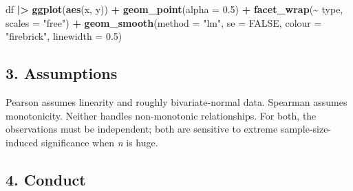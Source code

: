 \documentclass[
]{article}
\newenvironment{Shaded}{\begin{snugshade}}{\end{snugshade}}
\newcommand{\AttributeTok}[1]{\textcolor[rgb]{0.13,0.29,0.53}{#1}}
\newcommand{\ConstantTok}[1]{\textcolor[rgb]{0.56,0.35,0.01}{#1}}
\newcommand{\FloatTok}[1]{\textcolor[rgb]{0.00,0.00,0.81}{#1}}
\newcommand{\FunctionTok}[1]{\textcolor[rgb]{0.13,0.29,0.53}{\textbf{#1}}}
\newcommand{\NormalTok}[1]{#1}
\newcommand{\SpecialCharTok}[1]{\textcolor[rgb]{0.81,0.36,0.00}{\textbf{#1}}}
\newcommand{\StringTok}[1]{\textcolor[rgb]{0.31,0.60,0.02}{#1}}
\begin{document}
\begin{Shaded}
\begin{Highlighting}[]
\NormalTok{df }\SpecialCharTok{|\textgreater{}}
  \FunctionTok{ggplot}\NormalTok{(}\FunctionTok{aes}\NormalTok{(x, y)) }\SpecialCharTok{+}
  \FunctionTok{geom\_point}\NormalTok{(}\AttributeTok{alpha =} \FloatTok{0.5}\NormalTok{) }\SpecialCharTok{+}
  \FunctionTok{facet\_wrap}\NormalTok{(}\SpecialCharTok{\textasciitilde{}}\NormalTok{ type, }\AttributeTok{scales =} \StringTok{"free"}\NormalTok{) }\SpecialCharTok{+}
  \FunctionTok{geom\_smooth}\NormalTok{(}\AttributeTok{method =} \StringTok{"lm"}\NormalTok{, }\AttributeTok{se =} \ConstantTok{FALSE}\NormalTok{, }\AttributeTok{colour =} \StringTok{"firebrick"}\NormalTok{, }\AttributeTok{linewidth =} \FloatTok{0.5}\NormalTok{)}
\end{Highlighting}
\end{Shaded}

\subsection{3. Assumptions}\label{assumptions}

Pearson assumes linearity and roughly bivariate-normal data. Spearman
assumes monotonicity. Neither handles non-monotonic relationships. For
both, the observations must be independent; both are sensitive to
extreme sample-size-induced significance when \emph{n} is huge.

\subsection{4. Conduct}\label{conduct}
\end{document}
